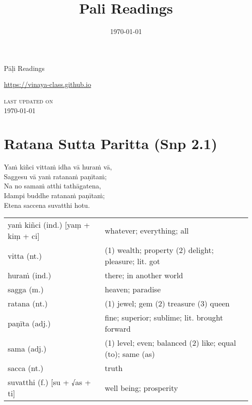 \documentclass[11pt,oneside]{memoir}
\date{\today}
\title{Pali Readings}
\begin{document}
\maketitle
\frontmatter

{\centering

{\Huge Pāḷi Readings}

\bigskip
\href{https://vinaya-class.github.io}{https://vinaya-class.github.io}

{\scshape\small last updated on}\\
\today

}

\bigskip
\tableofcontents*

\mainmatter

\chapter{Ratana Sutta Paritta (Snp 2.1)}
\label{sec:org1f18b61}

\newlength{\colOne}\setlength{\colOne}{0.3\linewidth}
\newlength{\colTwo}\setlength{\colTwo}{0.65\linewidth}

\begin{spacedquote}
Yaṁ kiñci vittaṁ idha vā huraṁ vā, \\[0pt]
Saggesu vā yaṁ ratanaṁ paṇītaṁ; \\[0pt]
Na no samaṁ atthi tathāgatena, \\[0pt]
Idampi buddhe ratanaṁ paṇītaṁ; \\[0pt]
Etena saccena suvatthi hotu.
\end{spacedquote}

\begin{longtable}{L{\colOne} L{\colTwo}}
yaṁ kiñci (ind.) [yaṃ + kiṃ + ci] & whatever; everything; all\\[0pt]
vitta (nt.) & (1) wealth; property (2) delight; pleasure; lit. got\\[0pt]
huraṁ (ind.) & there; in another world\\[0pt]
sagga (m.) & heaven; paradise\\[0pt]
ratana (nt.) & (1) jewel; gem (2) treasure (3) queen\\[0pt]
paṇīta (adj.) & fine; superior; sublime; lit. brought forward\\[0pt]
sama (adj.) & (1) level; even; balanced (2) like; equal (to); same (as)\\[0pt]
sacca (nt.) & truth\\[0pt]
suvatthi (f.) [su + √as + ti] & well being; prosperity\\[0pt]
\end{longtable}
\end{document}
